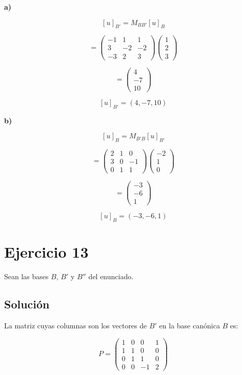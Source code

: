 \documentclass[11pt,a4paper]{article}
\begin{document}
	\textbf{a)}

	\[
	[u]_{B'}
	=
	M_{BB'}[u]_B
	\]

	\[
	=
	\begin{pmatrix}
	-1&1&1\\
	3&-2&-2\\
	-3&2&3
	\end{pmatrix}
	\begin{pmatrix}
	1\\2\\3
	\end{pmatrix}
	\]

	\[
	=
	\begin{pmatrix}
	4\\-7\\10
	\end{pmatrix}
	\]

	\[
	\boxed{
	[u]_{B'}=(4,-7,10)
	}
	\]

	\textbf{b)}

	\[
	[u]_B
	=
	M_{B'B}[u]_{B'}
	\]

	\[
	=
	\begin{pmatrix}
	2&1&0\\
	3&0&-1\\
	0&1&1
	\end{pmatrix}
	\begin{pmatrix}
	-2\\1\\0
	\end{pmatrix}
	\]

	\[
	=
	\begin{pmatrix}
	-3\\-6\\1
	\end{pmatrix}
	\]

	\[
	\boxed{
	[u]_B=(-3,-6,1)
	}
	\]

\section{Ejercicio 13}
	Sean las bases $B$, $B'$ y $B''$ del enunciado.

	\subsection{Solución}

	La matriz cuyas columnas son los vectores de $B'$ en la base canónica $B$ es:

	\[
	P=
	\begin{pmatrix}
	1&0&0&1\\
	1&1&0&0\\
	0&1&1&0\\
	0&0&-1&2
	\end{pmatrix}
	\]
\end{document}
